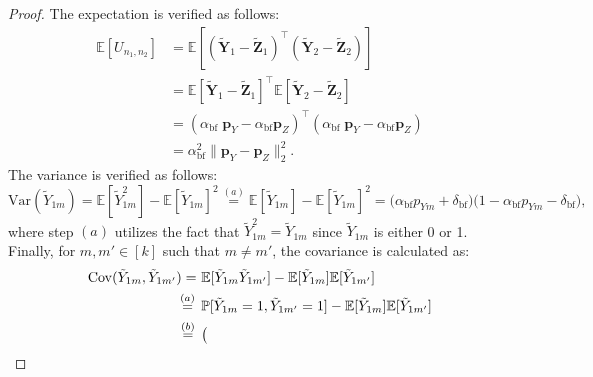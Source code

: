\documentclass[twoside,11pt]{article}
\newcommand{\rvTwo}{Y}
\newcommand{\rvThree}{Z}
\newcommand{\vectorize}[1]{\mathbf{#1}}
\newcommand{\mE}{\mathbb{E}} %
\newcommand{\mP}{\mathbb{P}} %
\newcommand{\alphabetSize}{k} %
\newcommand{\vectorIndex}{m}
\newcommand{\sampleSize}{n}
\newcommand{\probVecElement}[2]{p_{{#1}{#2}}}
\newcommand{\probVec}{\mathbf{p}} %
\newcommand{\privacyParameter}{\alpha} %
\newcommand{\privacyParameterrappor}{\privacyParameter_{\mathrm{bf}}}
\newcommand{\smallNumber}{\delta}
\newcommand{\smallNumberrappor}{\smallNumber_{\mathrm{bf}}}
\begin{document}
\begin{appendix}
\begin{lemma}
		
	\end{lemma}
	\begin{proof}
		The expectation is verified as follows:
		\allowdisplaybreaks
		\begin{align*}
			\mE[U_{\sampleSize_1, \sampleSize_2}]
			&=
			\mE[
			(
			\tilde{\vectorize{\rvTwo}}_1
			-
			\tilde{\vectorize{\rvThree}}_1
			)^\top
			(
			\tilde{\vectorize{\rvTwo}}_2
			-
			\tilde{\vectorize{\rvThree}}_2
			)
			]
			\\
			&= 
			\mE[
			\tilde{\vectorize{\rvTwo}}_1 - \tilde{\vectorize{\rvThree}}_1]^\top
			\mE[
			\tilde{\vectorize{\rvTwo}}_2
			-
			\tilde{\vectorize{\rvThree}}_2
			]	
			\\&=
			(\privacyParameterrappor \; \probVec_\rvTwo - \privacyParameterrappor\probVec_\rvThree)^\top
			(\privacyParameterrappor \; \probVec_\rvTwo - \privacyParameterrappor\probVec_\rvThree)
			\\&=
			\privacyParameterrappor^2 \|
			\probVec_\rvTwo - \probVec_\rvThree
			\|_2^2.
		\end{align*} 
		The variance is verified as follows:
		\begin{equation}
			\mathrm{Var}(\tilde{Y}_{1\vectorIndex})
			=
			\mE[\tilde{\rvTwo}_{1\vectorIndex}^2] - \mE[\tilde{Y}_{1\vectorIndex}]^2
			\stackrel{(a)}{=}
			\mE[\tilde{Y}_{1\vectorIndex}] - \mE[\tilde{Y}_{1\vectorIndex}]^2
			=
			\bigl(
			\privacyParameterrappor 
			\probVecElement{\rvTwo}{\vectorIndex}
			+ \smallNumberrappor
			\bigr)
			\bigl(
			1
			-\privacyParameterrappor 
			\probVecElement{\rvTwo}{\vectorIndex}
			- \smallNumberrappor
			\bigr),
		\end{equation}
		where step $(a)$ utilizes the fact that $\tilde{Y}_{1\vectorIndex}^2 = \tilde{Y}_{1\vectorIndex}$ since $\tilde{Y}_{1\vectorIndex}$ is either 0 or 1.	
		Finally, for $\vectorIndex,\vectorIndex' \in [\alphabetSize]$ such that $\vectorIndex \neq \vectorIndex'$, the covariance is calculated as:
		\begin{align*}
			\mathrm{Cov}(\tilde{Y}_{1\vectorIndex}, \tilde{Y}_{1\vectorIndex'})
			= ~&
			\mE[\tilde{Y}_{1\vectorIndex} \tilde{Y}_{1\vectorIndex'}] - \mE[\tilde{Y}_{1\vectorIndex}] \mE[\tilde{Y}_{1\vectorIndex'}]
			\\ \stackrel{(a)}{=} \hskip 1.57mm &
			\mP[\tilde{Y}_{1\vectorIndex}=1, \tilde{Y}_{1\vectorIndex'}=1] - \mE[\tilde{Y}_{1\vectorIndex}] \mE[\tilde{Y}_{1\vectorIndex'}]
			\\ \stackrel{(b)}{=} \hskip 1.62mm &
			\bigl(

\end{align*}
\end{proof}
\end{appendix}
\end{document}
